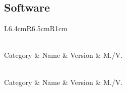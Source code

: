 \subsection{Software}
{
\setlength{\tabcolsep}{5pt}
\begin{longtable}{L{6.4cm}R{6.5cm}R{1cm}}
	\caption[List of Software Used in This Work]{List of software used in this work. Abbreviations: M./V.: Manufacturer or vendor.\label{tbl-mat-sw}}\\
	\toprule
	{Category} & {Name \& Version} & {M./V.} \\
	\hline \endfirsthead
	\caption[]{\textit{continued from the previous page}} \\
	\toprule
	{Category} & {Name \& Version} & {M./V.} \\
	\hline \endhead
	\hline
	 \\
	\endfoot
	\bottomrule
	\endlastfoot
\end{longtable}
}

